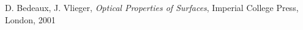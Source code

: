 \clearpage
\begin{thebibliography}{9}


      D. Bedeaux, J. Vlieger, 
      \emph{Optical Properties of Surfaces}, 
      Imperial College Press, 
      London, 2001


\end{thebibliography}
